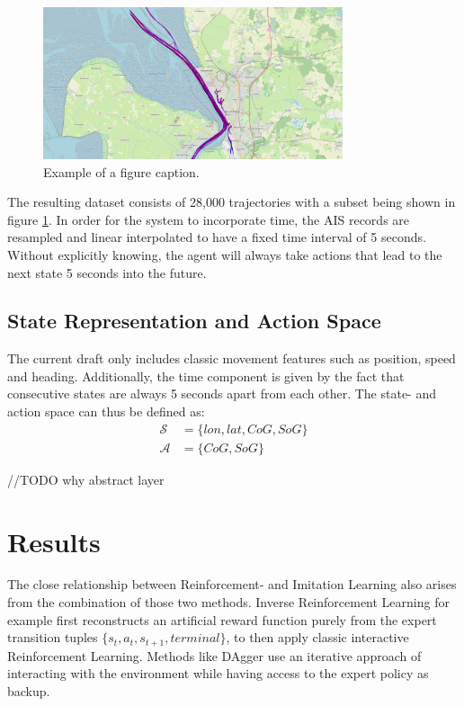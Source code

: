\documentclass[conference]{IEEEtran}
\begin{document}
\begin{figure}[t]
\centerline{\includegraphics[width=250pt]{images/tracks.PNG}}
\caption{Example of a figure caption.}
\label{fig:tracks}
\end{figure}
The resulting dataset consists of 28,000 trajectories with a subset being shown in figure \ref{fig:tracks}. In order for the system to incorporate time, the AIS records are resampled and linear interpolated to have a fixed time interval of 5 seconds. Without explicitly knowing, the agent will always take actions that lead to the next state 5 seconds into the future.

\subsection{State Representation and Action Space}
The current draft only includes classic movement features such as position, speed and heading. Additionally, the time component is given by the fact that consecutive states are always 5 seconds apart from each other. The state- and action space can thus be defined as:
\begin{equation}
    \begin{aligned}
        \mathcal{S} &= \{lon, lat, CoG, SoG\} \\
        \mathcal{A} &= \{CoG, SoG\}
    \end{aligned}
\end{equation}

//TODO why abstract layer

\section{Results}

The close relationship between Reinforcement- and Imitation Learning also arises from the combination of those two methods. Inverse Reinforcement Learning for example first reconstructs an artificial reward function purely from the expert transition tuples $\{s_t, a_t, s_{t+1}, terminal\}$, to then apply classic interactive Reinforcement Learning. Methods like DAgger use an iterative approach of interacting with the environment while having access to the expert policy as backup.
\par
\end{document}
